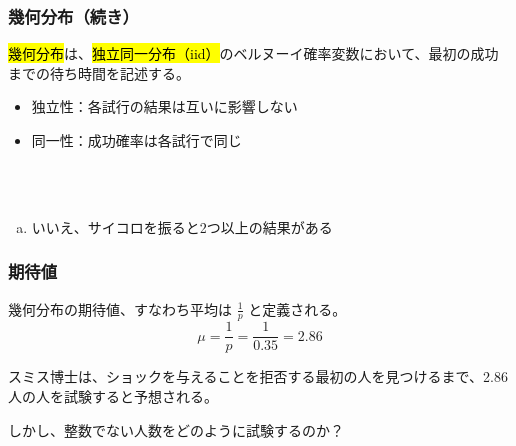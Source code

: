 
\begin{frame}
\frametitle{幾何分布（続き）}

\hl{幾何分布}は、\hl{独立同一分布（iid）}のベルヌーイ確率変数において、最初の成功までの待ち時間を記述する。
\begin{itemize}
\item 独立性：各試行の結果は互いに影響しない
\item 同一性：成功確率は各試行で同じ
\end{itemize}

$\:$ \\
$\:$ \\


\end{frame}


\begin{frame}


\begin{enumerate}[(a)]
\item いいえ、サイコロを振ると2つ以上の結果がある
\end{enumerate}

\soln{
\[P(\text{6回目で初めて6の目}) = \pr{ \frac{5}{6} }^5 \pr{ \frac{1}{6} } \approx 0.067 \]
}

\end{frame}


\begin{frame}
\frametitle{期待値}


幾何分布の期待値、すなわち平均は $\frac{1}{p}$ と定義される。
\[ \mu = \frac{1}{p} = \frac{1}{0.35} = 2.86 \]

スミス博士は、ショックを与えることを拒否する最初の人を見つけるまで、2.86人の人を試験すると予想される。

しかし、整数でない人数をどのように試験するのか？

\end{frame}

